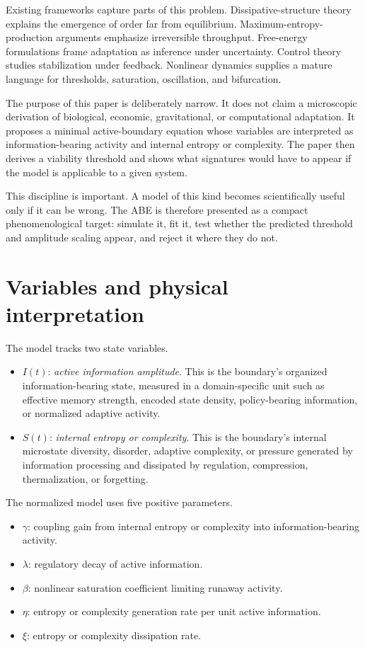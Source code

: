 \documentclass[11pt]{article}
\begin{document}
Existing frameworks capture parts of this problem. Dissipative-structure theory explains the emergence of order far from equilibrium. Maximum-entropy-production arguments emphasize irreversible throughput. Free-energy formulations frame adaptation as inference under uncertainty. Control theory studies stabilization under feedback. Nonlinear dynamics supplies a mature language for thresholds, saturation, oscillation, and bifurcation.

The purpose of this paper is deliberately narrow. It does not claim a microscopic derivation of biological, economic, gravitational, or computational adaptation. It proposes a minimal active-boundary equation whose variables are interpreted as information-bearing activity and internal entropy or complexity. The paper then derives a viability threshold and shows what signatures would have to appear if the model is applicable to a given system.

This discipline is important. A model of this kind becomes scientifically useful only if it can be wrong. The ABE is therefore presented as a compact phenomenological target: simulate it, fit it, test whether the predicted threshold and amplitude scaling appear, and reject it where they do not.

\section{Variables and physical interpretation}
The model tracks two state variables.
\begin{itemize}
  \item $I(t)$: \textit{active information amplitude}. This is the boundary's organized information-bearing state, measured in a domain-specific unit such as effective memory strength, encoded state density, policy-bearing information, or normalized adaptive activity.
  \item $S(t)$: \textit{internal entropy or complexity}. This is the boundary's internal microstate diversity, disorder, adaptive complexity, or pressure generated by information processing and dissipated by regulation, compression, thermalization, or forgetting.
\end{itemize}

The normalized model uses five positive parameters.
\begin{itemize}
  \item $\gamma$: coupling gain from internal entropy or complexity into information-bearing activity.
  \item $\lambda$: regulatory decay of active information.
  \item $\beta$: nonlinear saturation coefficient limiting runaway activity.
  \item $\eta$: entropy or complexity generation rate per unit active information.
  \item $\xi$: entropy or complexity dissipation rate.
\end{itemize}
\end{document}
